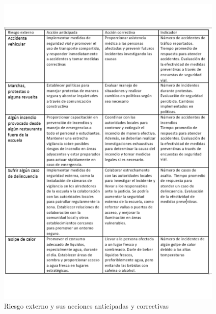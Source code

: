     \begin{figure}[H]
        \centering
        \includegraphics[scale=0.25]{30/img/TablotaDeRiesgoext.pdf}
        \caption{Riesgo externo y sus acciones anticipadas y correctivas}
    \end{figure}
    

